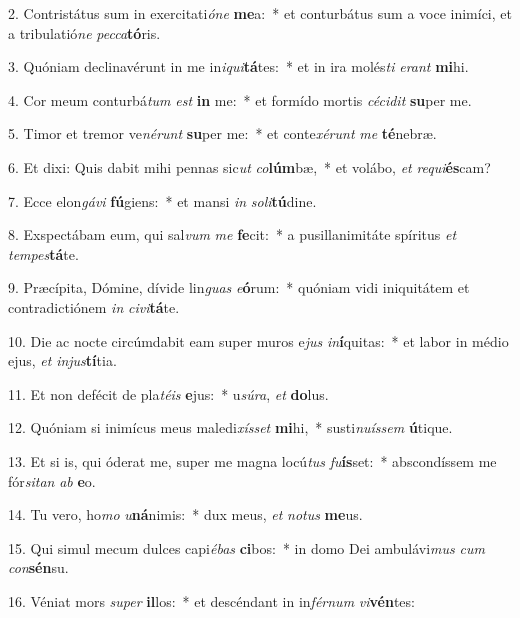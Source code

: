 2. Contristátus sum in exercitati\textit{ó}\textit{ne} \textbf{me}a:~*  et conturbátus sum a voce inimíci, et a tribulatió\textit{ne} \textit{pec}\textit{ca}\textbf{tó}ris.\

3. Quóniam declinavérunt in me in\textit{i}\textit{qui}\textbf{tá}tes:~*  et in ira molés\textit{ti} \textit{e}\textit{rant} \textbf{mi}hi.\

4. Cor meum conturbá\textit{tum} \textit{est} \textbf{in} me:~*  et formído mortis \textit{cé}\textit{ci}\textit{dit} \textbf{su}per me.\

5. Timor et tremor ve\textit{né}\textit{runt} \textbf{su}per me:~*  et conte\textit{xé}\textit{runt} \textit{me} \textbf{té}nebræ.\

6. Et dixi: Quis dabit mihi pennas sic\textit{ut} \textit{co}\textbf{lúm}bæ,~*  et volábo, \textit{et} \textit{re}\textit{qui}\textbf{és}cam?\

7. Ecce elon\textit{gá}\textit{vi} \textbf{fú}giens:~*  et mansi \textit{in} \textit{so}\textit{li}\textbf{tú}dine.\

8. Exspectábam eum, qui sal\textit{vum} \textit{me} \textbf{fe}cit:~*  a pusillanimitáte spíritus \textit{et} \textit{tem}\textit{pes}\textbf{tá}te.\

9. Præcípita, Dómine, dívide lin\textit{guas} \textit{e}\textbf{ó}rum:~*  quóniam vidi iniquitátem et contradictiónem \textit{in} \textit{ci}\textit{vi}\textbf{tá}te.\

10. Die ac nocte circúmdabit eam super muros e\textit{jus} \textit{in}\textbf{í}quitas:~*  et labor in médio ejus, \textit{et} \textit{in}\textit{jus}\textbf{tí}tia.\

11. Et non defécit de pla\textit{té}\textit{is} \textbf{e}jus:~*  u\textit{sú}\textit{ra}, \textit{et} \textbf{do}lus.\

12. Quóniam si inimícus meus maledi\textit{xís}\textit{set} \textbf{mi}hi,~*  susti\textit{nu}\textit{ís}\textit{sem} \textbf{ú}tique.\

13. Et si is, qui óderat me, super me magna locú\textit{tus} \textit{fu}\textbf{ís}set:~*  abscondíssem me fór\textit{si}\textit{tan} \textit{ab} \textbf{e}o.\

14. Tu vero, ho\textit{mo} \textit{u}\textbf{ná}nimis:~*  dux meus, \textit{et} \textit{no}\textit{tus} \textbf{me}us.\

15. Qui simul mecum dulces capi\textit{é}\textit{bas} \textbf{ci}bos:~*  in domo Dei ambulávi\textit{mus} \textit{cum} \textit{con}\textbf{sén}su.\

16. Véniat mors \textit{su}\textit{per} \textbf{il}los:~*  et descéndant in in\textit{fér}\textit{num} \textit{vi}\textbf{vén}tes:\

